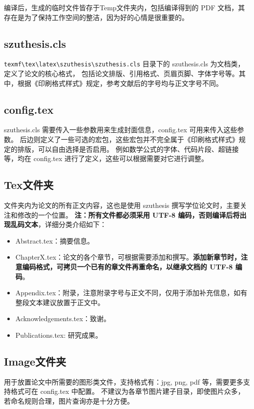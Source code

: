编译后，生成的临时文件皆存于Temp文件夹内，包括编译得到的 PDF 文档，其存在是为了保持工作空间的整洁，因为好的心情是很重要的。

\subsection{szuthesis.cls}

\verb!texmf\tex\latex\szuthesis\szuthesis.cls! 目录下的 szuthesis.cls 为文档类，定义了论文的核心格式，
包括论文排版、引用格式、页眉页脚、字体字号等。其中，根据《印刷格式样式》规定，参考文献后的字号均与正文字号不同。

\subsection{config.tex}

szuthesis.cls 需要传入一些参数用来生成封面信息，config.tex 可用来传入这些参数。
后边则定义了一些可选的宏包，这些宏包并不完全属于《印刷格式样式》规定的排版，可以自由选择是否启用。
例如数学公式的字体、代码片段、超链接等，均在 config.tex 进行了定义，这些可以根据需要对它进行调整。

\subsection{Tex文件夹}

文件夹内为论文的所有正文内容，这也是使用 szuthesis 撰写学位论文时，主要关注和修改的一个位置。
\textbf{注：所有文件都必须采用 UTF-8 编码，否则编译后将出现乱码文本}，详细分类介绍如下：

\begin{itemize}
    \item Abstract.tex：摘要信息。
    \item ChapterX.tex：论文的各个章节，可根据需要添加和撰写。\textbf{添加新章节时，注意编码格式，可拷贝一个已有的章文件再重命名，以继承文档的 UTF-8 编码}。
    \item Appendix.tex：附录，注意附录字号与正文不同，仅用于添加补充信息，如有整段文本建议放置于正文中。
    \item Acknowledgements.tex：致谢。
    \item Publications.tex: 研究成果。
\end{itemize}

\subsection{Image文件夹}

用于放置论文中所需要的图形类文件，支持格式有：jpg, png, pdf 等，需要更多支持格式可在 config.tex 中配置。
不建议为各章节图片建子目录，即使图片众多，若命名规则合理，图片查询亦是十分方便。

